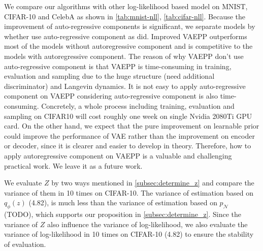 We compare our algorithms with other log-likelihood based model on MNIST, CIFAR-10 and CelebA as shown in \cref{tab:mnist-nll}, \cref{tab:cifar-nll}. Because the improvement of auto-regressive components is significant, we separate models by whether use auto-regressive component as \cite{maaloe2019biva} did. Improved VAEPP outperforms most of the models without autoregressive component and is competitive to the models with autoregressive component. The reason of why VAEPP don't use auto-regressive component is that VAEPP is time-consuming in training,  evaluation and sampling due to the huge structure (need additional discriminator) and Langevin dynamics. It is not easy to apply auto-regressive component on VAEPP considering auto-regressive component is also time-consuming. Concretely, a whole process including training, evaluation and sampling on CIFAR10 will cost roughly one week on single Nvidia 2080Ti GPU card. On the other hand, we expect that the pure improvement on learnable prior could improve the performance of VAE rather than the improvement on encoder or decoder, since it is clearer and easier to develop in theory. Therefore, how to apply autoregressive component on VAEPP is a valuable and challenging practical work. We leave it as a future work.

We evaluate $Z$ by two ways mentioned in \cref{subsec:determine_z} and compare the variance of them in 10 times on CIFAR-10. The variance of estimation based on $q_\phi(z)$ (4.82), is much less than the variance of estimation based on $p_\mathcal{N}$ (TODO), which supports our proposition in \cref{subsec:determine_z}. Since the variance of $Z$ also influence the variance of log-likelihood, we also evaluate the variance of log-likelihood in 10 times on CIFAR-10 (4.82) to ensure the stability of evaluation. 

